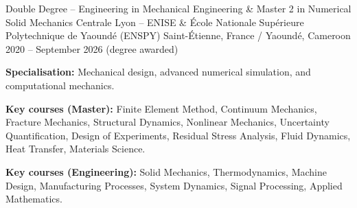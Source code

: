 \documentclass[11pt, a4paper]{awesome-cv}
\begin{document}
\makecvheader

\begin{cventries}

  \cventry
    {Double Degree – Engineering in Mechanical Engineering \& Master 2 in Numerical Solid Mechanics}
    {Centrale Lyon -- ENISE \& \'Ecole Nationale Sup\'erieure Polytechnique de Yaound\'e (ENSPY)}
    {Saint-Étienne, France / Yaoundé, Cameroon}
    {2020 -- September 2026 (degree awarded)}
    {
      \begin{cvitems}
        \item \textbf{Specialisation:} Mechanical design, advanced numerical simulation, and computational mechanics.
        \item \textbf{Key courses (Master):} Finite Element Method, Continuum Mechanics, Fracture Mechanics, Structural Dynamics, Nonlinear Mechanics, Uncertainty Quantification, Design of Experiments, Residual Stress Analysis, Fluid Dynamics, Heat Transfer, Materials Science.
        \item \textbf{Key courses (Engineering):} Solid Mechanics, Thermodynamics, Machine Design, Manufacturing Processes, System Dynamics, Signal Processing, Applied Mathematics.
      \end{cvitems}
    }

\end{cventries}
\end{document}
